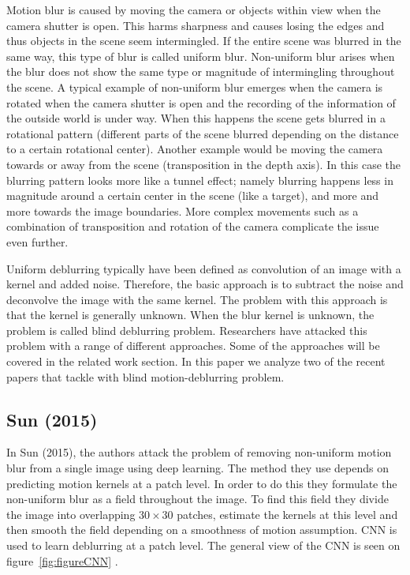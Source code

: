 \documentclass[10pt,twocolumn,letterpaper]{article}
\begin{document}
Motion blur is caused by moving the camera or objects within view when the camera shutter is open. This harms sharpness and causes losing the edges and thus objects in the scene seem intermingled. If the entire scene was blurred in the same way, this type of blur is called uniform blur. Non-uniform blur arises when the blur does not show the same type or magnitude of intermingling throughout the scene. A typical example of non-uniform blur emerges when the camera is rotated when the camera shutter is open and the recording of the information of the outside world is under way. When this happens the scene gets blurred in a rotational pattern (different parts of the scene blurred depending on the distance to a certain rotational center). Another example would be moving the camera towards or away from the scene (transposition in the depth axis). In this case the blurring pattern looks more like a tunnel effect; namely blurring happens less in magnitude around a certain center in the scene (like a target), and more and more towards the image boundaries. More complex movements such as a combination of transposition and rotation of the camera complicate the issue even further.

Uniform deblurring typically have been defined as convolution of an image with a kernel and added noise. Therefore, the basic approach is to subtract the noise and deconvolve the image with the same kernel. The problem with this approach is that the kernel is generally unknown. When the blur kernel is unknown, the problem is called blind deblurring problem. Researchers have attacked this problem with a range of different approaches. Some of the approaches will be covered in the related work section. In this paper we analyze two of the recent papers that tackle with blind motion-deblurring problem.

\subsection{Sun \textbf{\etal} (2015)}

In Sun \etal (2015), the authors attack the problem of removing non-uniform motion blur from a single image using deep learning. The method they use depends on predicting motion kernels at a patch level. In order to do this they formulate the non-uniform blur as a field throughout the image. To find this field they divide the image into overlapping $30 \times 30$ patches, estimate the kernels at this level and then smooth the field depending on a smoothness of motion assumption. CNN is used to learn deblurring at a patch level. The general view of the CNN is seen on figure~\ref{fig:figureCNN} \cite{sun2015learning}.
\end{document}
